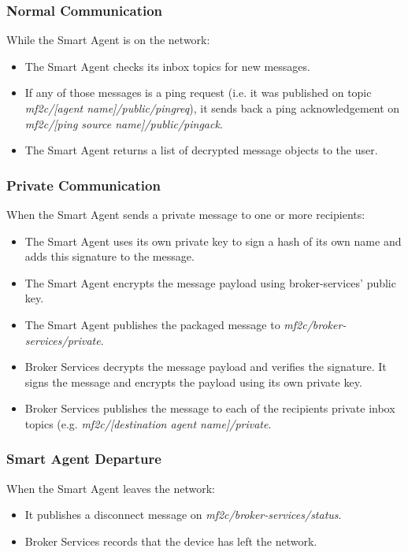\subsubsection{Normal Communication}
While the Smart Agent is on the network:
\begin{itemize}
    \item The Smart Agent checks its inbox topics for new messages.
    \item If any of those messages is a ping request (i.e. it was published on topic \textit{mf2c/[agent name]/public/pingreq}), it sends back a ping acknowledgement on \textit{mf2c/[ping source name]/public/pingack}.
    \item The Smart Agent returns a list of decrypted message objects to the user.
\end{itemize}

\subsubsection{Private Communication}
When the Smart Agent sends a private message to one or more recipients:
\begin{itemize}
    \item The Smart Agent uses its own private key to sign a hash of its own name and adds this signature to the message.
    \item The Smart Agent encrypts the message payload using broker-services' public key.
    \item The Smart Agent publishes the packaged message to \textit{mf2c/broker-services/private}.
    \item Broker Services decrypts the message payload and verifies the signature. It signs the message and encrypts the payload using its own private key.
    \item Broker Services publishes the message to each of the recipients private inbox topics (e.g. \textit{mf2c/[destination agent name]/private}.
\end{itemize}

\subsubsection{Smart Agent Departure}
When the Smart Agent leaves the network:
\begin{itemize}
    \item It publishes a disconnect message on \textit{mf2c/broker-services/status}.
    \item Broker Services records that the device has left the network.
\end{itemize}
